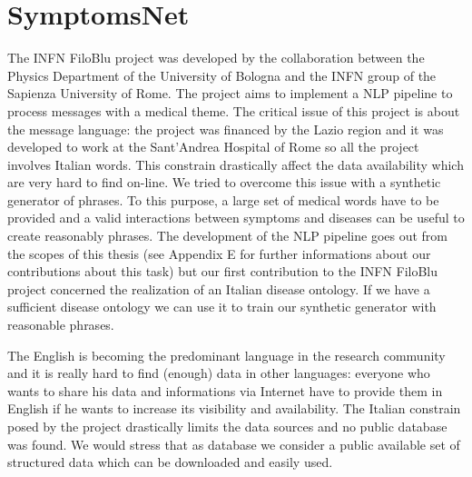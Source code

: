 \documentclass{standalone}
\begin{document}
\section[SymptomsNet]{SymptomsNet}\label{chimera:symptoms}

The INFN FiloBlu project was developed by the collaboration between the Physics Department of the University of Bologna and the INFN group of the Sapienza University of Rome.
The project aims to implement a NLP pipeline to process messages with a medical theme.
The critical issue of this project is about the message language: the project was financed by the Lazio region and it was developed to work at the Sant'Andrea Hospital of Rome so all the project involves Italian words.
This constrain drastically affect the data availability which are very hard to find on-line.
We tried to overcome this issue with a synthetic generator of phrases.
To this purpose, a large set of medical words have to be provided and a valid interactions between symptoms and diseases can be useful to create reasonably phrases.
The development of the NLP pipeline goes out from the scopes of this thesis (see Appendix E for further informations about our contributions about this task) but our first contribution to the INFN FiloBlu project concerned the realization of an Italian disease ontology.
If we have a sufficient disease ontology we can use it to train our synthetic generator with reasonable phrases.

The English is becoming the predominant language in the research community and it is really hard to find (enough) data in other languages: everyone who wants to share his data and informations via Internet have to provide them in English if he wants to increase its visibility and availability.
The Italian constrain posed by the project drastically limits the data sources and no public database was found.
We would stress that as database we consider a public available set of structured data which can be downloaded and easily used.
\end{document}
